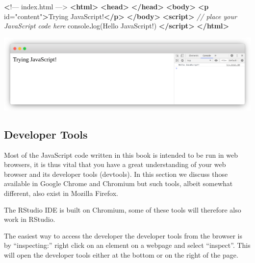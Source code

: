 \documentclass[
]{krantz}
\makeatletter
\newenvironment{Shaded}{\begin{snugshade}}{\end{snugshade}}
\newcommand{\BuiltInTok}[1]{#1}
\newcommand{\CommentTok}[1]{\textcolor[rgb]{0.37,0.37,0.37}{\textit{#1}}}
\newcommand{\ErrorTok}[1]{\textcolor[rgb]{0.14,0.14,0.14}{\textbf{#1}}}
\newcommand{\FunctionTok}[1]{\textcolor[rgb]{0,0,0}{#1}}
\newcommand{\KeywordTok}[1]{\textcolor[rgb]{0.27,0.27,0.27}{\textbf{#1}}}
\newcommand{\NormalTok}[1]{#1}
\newcommand{\OperatorTok}[1]{\textcolor[rgb]{0.43,0.43,0.43}{\textbf{#1}}}
\newcommand{\OtherTok}[1]{\textcolor[rgb]{0.37,0.37,0.37}{#1}}
\newcommand{\StringTok}[1]{\textcolor[rgb]{0.5,0.5,0.5}{#1}}
\newenvironment{kframe}{%
\medskip{}
\setlength{\fboxsep}{.8em}
 \def\at@end@of@kframe{}%
 \ifinner\ifhmode%
  \def\at@end@of@kframe{\end{minipage}}%
  \begin{minipage}{\columnwidth}%
 \fi\fi%
 \def\FrameCommand##1{\hskip\@totalleftmargin \hskip-\fboxsep
 \colorbox{shadecolor}{##1}\hskip-\fboxsep
     \hskip-\linewidth \hskip-\@totalleftmargin \hskip\columnwidth}%
 \MakeFramed {\advance\hsize-\width
   \@totalleftmargin\z@ \linewidth\hsize
   \@setminipage}}%
 {\par\unskip\endMakeFramed%
 \at@end@of@kframe}
\renewenvironment{Shaded}{\begin{kframe}}{\end{kframe}}
\newenvironment{rmdblock}[1]
  {
  \begin{itemize}
  \renewcommand{\labelitemi}{
    \raisebox{-.7\height}[0pt][0pt]{
      {\setkeys{Gin}{width=3em,keepaspectratio}\texttt{[image: images/\#1]}}
    }
  }
  \setlength{\fboxsep}{1em}
  \begin{kframe}
  \item
  }
  {
  \end{kframe}
  \end{itemize}
  }
\newenvironment{rmdnote}
  {\begin{rmdblock}{note}}
  {\end{rmdblock}}
\makeatother
\begin{document}
\begin{Shaded}
\begin{Highlighting}[]
\ErrorTok{\textless{}}\NormalTok{!–– index.html ––\textgreater{}}
\KeywordTok{\textless{}html\textgreater{}}
  \KeywordTok{\textless{}head\textgreater{}}
  \KeywordTok{\textless{}/head\textgreater{}}
  \KeywordTok{\textless{}body\textgreater{}}
    \KeywordTok{\textless{}p}\OtherTok{ id=}\StringTok{"content"}\KeywordTok{\textgreater{}}\NormalTok{Trying JavaScript!}\KeywordTok{\textless{}/p\textgreater{}}
  \KeywordTok{\textless{}/body\textgreater{}}
  \KeywordTok{\textless{}script\textgreater{}}
    \CommentTok{// place your JavaScript code here}
    \BuiltInTok{console}\OperatorTok{.}\FunctionTok{log}\NormalTok{(}\StringTok{\textquotesingle{}Hello JavaScript!\textquotesingle{}}\NormalTok{)}
  \KeywordTok{\textless{}/script\textgreater{}}
\KeywordTok{\textless{}/html\textgreater{}}
\end{Highlighting}
\end{Shaded}

\includegraphics{images/tryingjs.png}

\hypertarget{basics-chrome-devtools}{%
\subsection{Developer Tools}\label{basics-chrome-devtools}}

Most of the JavaScript code written in this book is intended to be run in web browsers, it is thus vital that you have a great understanding of your web browser and its developer tools (devtools). In this section we discuss those available in Google Chrome and Chromium but such tools, albeit somewhat different, also exist in Mozilla Firefox.

\begin{rmdnote}
The RStudio IDE is built on Chromium, some of these tools will therefore
also work in RStudio.
\end{rmdnote}

The easiest way to access the developer the developer tools from the browser is by ``inspecting:'' right click on an element on a webpage and select ``inspect''. This will open the developer tools either at the bottom or on the right of the page.
\end{document}
